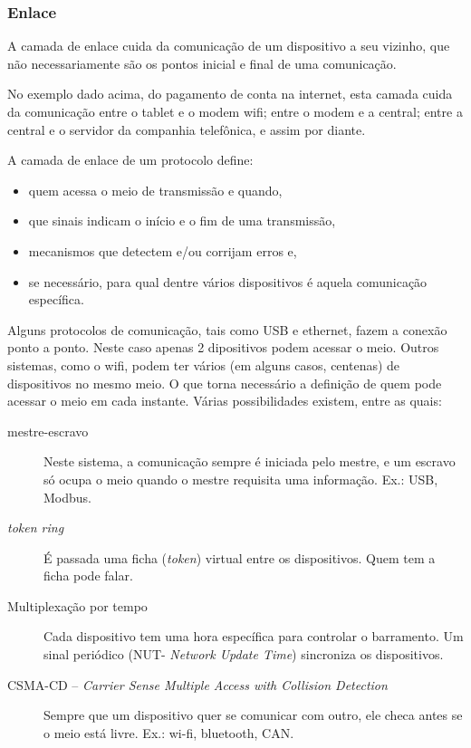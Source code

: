 \subsubsection{Enlace}

A camada de enlace cuida da comunicação de um dispositivo a seu vizinho, que não necessariamente são os pontos inicial e final de uma comunicação.

No exemplo dado acima, do pagamento de conta na internet, esta camada cuida da comunicação entre o tablet e o modem wifi; entre o modem e a central; entre a central e o servidor da companhia telefônica, e assim por diante.

A camada de enlace de um protocolo define:
\begin{itemize}
	\item quem acessa o meio de transmissão e quando,
	\item que sinais indicam o início e o fim de uma transmissão,
	\item mecanismos que detectem e/ou corrijam erros e,
	\item se necessário, para qual dentre vários dispositivos é aquela comunicação específica.
\end{itemize} 

Alguns protocolos de comunicação, tais como USB e ethernet, fazem a conexão ponto a ponto. Neste caso apenas 2 dipositivos podem acessar o meio. Outros sistemas, como o wifi, podem ter vários (em alguns casos, centenas) de dispositivos no mesmo meio. O que torna necessário a definição de quem pode acessar o meio em cada instante. Várias possibilidades existem, entre as quais:
\begin{description}
	\item[mestre-escravo] Neste sistema, a comunicação sempre é iniciada pelo mestre, e um escravo só ocupa o meio quando o mestre requisita uma informação. Ex.: USB, Modbus.
	\item[\emph{token ring}] É passada uma ficha (\emph{token}) virtual entre os dispositivos. Quem tem a ficha pode falar.
	\item[Multiplexação por tempo] Cada dispositivo tem uma hora específica para controlar o barramento. Um sinal periódico (NUT- \emph{Network Update Time}) sincroniza os dispositivos.
	\item[CSMA-CD -- \emph{Carrier Sense Multiple Access with Collision Detection}] Sempre que um dispositivo quer se comunicar com outro, ele checa antes se o meio está livre. Ex.: wi-fi, bluetooth, CAN.
\end{description}

